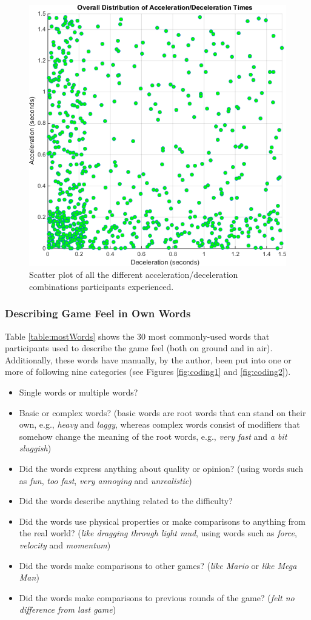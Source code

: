 \begin{figure}[htbp]
\centering
\includegraphics[width=0.7\columnwidth]{Pics/Classes/overall_distribution}
\caption{Scatter plot of all the different acceleration/deceleration combinations participants experienced.}
\label{fig:overallDistribution}
\end{figure}

\subsubsection{Describing Game Feel in Own Words}
Table \ref{table:mostWords} shows the 30 most commonly-used words that participants used to describe the game feel (both on ground and in air). Additionally, these words have manually, by the author, been put into one or more of following nine categories (see Figures \ref{fig:coding1} and \ref{fig:coding2}).
\begin{itemize}[noitemsep,nolistsep]
\item Single words or multiple words?
\item Basic or complex words? (basic words are root words that can stand on their own, e.g., \textit{heavy} and \textit{laggy}, whereas complex words consist of modifiers that somehow change the meaning of the root words, e.g., \textit{very fast} and \textit{a bit sluggish})
\item Did the words express anything about quality or opinion? (using words such as \textit{fun}, \textit{too fast}, \textit{very annoying} and \textit{unrealistic})
\item Did the words describe anything related to the difficulty?
\item Did the words use physical properties or make comparisons to anything from the real world? (\textit{like dragging through light mud}, using words such as \textit{force}, \textit{velocity} and \textit{momentum})
\item Did the words make comparisons to other games? (\textit{like Mario} or \textit{like Mega Man})
\item Did the words make comparisons to previous rounds of the game? (\textit{felt no difference from last game})
\end{itemize}

